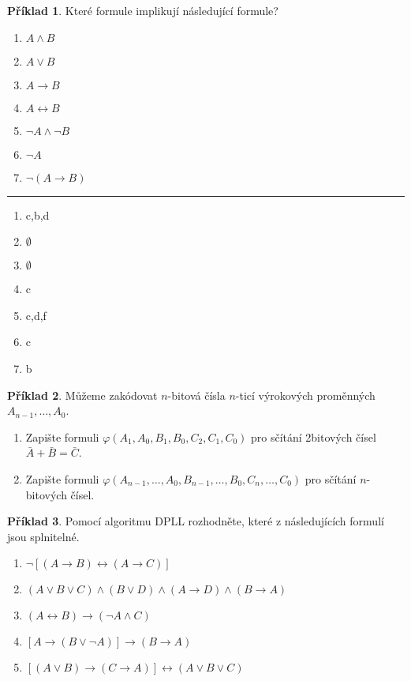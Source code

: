 \documentclass[a4paper]{article}
\theoremstyle{definition}
\newtheorem{priklad}{Příklad}
\begin{document}
\begin{priklad}
    Které formule implikují následující formule?
    \begin{enumerate}
        \item $ A\wedge B $
        \item $ A\vee B $
        \item $ A\rightarrow B $
        \item $ A\leftrightarrow B $
        \item $ \neg A\wedge \neg B $
        \item $ \neg A $
        \item $ \neg(A\rightarrow B) $
    \end{enumerate}
\noindent\rule{\linewidth}{.2pt}
\begin{enumerate}
    \item c,b,d
    \item $ \emptyset $
    \item $ \emptyset $
    \item c
    \item c,d,f
    \item c
    \item b
\end{enumerate}
\end{priklad}

\begin{priklad}
    Můžeme zakódovat $ n $-bitová čísla $ n $-ticí výrokových proměnných $ A_{n-1},\ldots,A_0 $.
    \begin{enumerate}
        \item Zapište formuli $ \varphi(A_1,A_0,B_1,B_0,C_2,C_1,C_0) $ pro sčítání 2bitových čísel $ \bar{A}+\bar{B} = \bar{C} $.
        \item Zapište formuli $ \varphi(A_{n-1},\ldots,A_0,B_{n-1},\ldots,B_0,C_n,\ldots,C_0) $ pro sčítání $ n $-bitových čísel.
    \end{enumerate}
\end{priklad}

\begin{priklad}
    Pomocí algoritmu DPLL rozhodněte, které z následujících formulí jsou splnitelné.
    \begin{enumerate}
        \item $ \neg\left[(A\rightarrow B)\leftrightarrow (A\rightarrow C)\right] $
        \item $ (A\vee B\vee C)\wedge (B\vee D)\wedge (A\rightarrow D)\wedge (B\rightarrow A) $
        \item $ (A\leftrightarrow B)\rightarrow (\neg A\wedge C) $
        \item $ \left[A\rightarrow (B\vee\neg A)\right]\rightarrow (B\rightarrow A) $
        \item $ \left[(A\vee B)\rightarrow (C\rightarrow A)\right]\leftrightarrow (A\vee B\vee C) $
    \end{enumerate}
\end{priklad}
\end{document}

